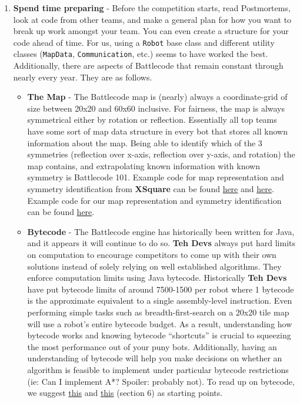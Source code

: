 \begin{enumerate}
  \item \textbf{Spend time preparing} - Before the competition starts, read Postmortems, look at code from other teams, and make a general plan for how you want to break up work amongst your team. You can even create a structure for your code ahead of time. For us, using a \verb|Robot| base class and different utility classes (\verb|MapData|, \verb|Communication|, etc.) seems to have worked the best. Additionally, there are aspects of Battlecode that remain constant through nearly every year. They are as follows.
  \begin{itemize}
      \item \textbf{The Map} - The Battlecode map is (nearly) always a coordinate-grid of size between 20x20 and 60x60 inclusive. For fairness, the map is always symmetrical either by rotation or reflection. Essentially all top teams have some sort of map data structure in every bot that stores all known information about the map. Being able to identify which of the 3 symmetries (reflection over x-axis, reflection over y-axis, and rotation) the map contains, and extrapolating known information with known symmetry is Battlecode 101. Example code for map representation and symmetry identification from \textbf{XSquare} can be found \href{https://github.com/IvanGeffner/BC25/blob/master/basic45/Map.java}{here} and \href{https://github.com/IvanGeffner/BC25/blob/master/basic45/SymmetryManager.java}{here}. Example code for our map representation and symmetry identification can be found \href{https://github.com/justinottesen/battlecode25/blob/main/java/src/quals/util/MapData.java}{here}. 
      \item \textbf{Bytecode} - The Battlecode engine has historically been written for Java, and it appears it will continue to do so. \textbf{Teh Devs} always put hard limits on computation to encourage competitors to come up with their own solutions instead of solely relying on well established algorithms. They enforce computation limits using Java bytecode. Historically \textbf{Teh Devs} have put bytecode limits of around 7500-1500 per robot where 1 bytecode is the approximate equivalent to a single assembly-level instruction. Even performing simple tasks such as breadth-first-search on a 20x20 tile map will use a robot's entire bytecode budget. As a result, understanding how bytecode works and knowing bytecode ``shortcuts'' is crucial to squeezing the most performance out of your puny bots. Additionally, having an understanding of bytecode will help you make decisions on whether an algorithm is feasible to implement under particular bytecode restrictions (ie: Can I implement A*? Spoiler: probably not). To read up on bytecode, we suggest \href{https://cory.li/bytecode-hacking/}{this} and \href{https://battlecode.org/assets/files/battlecode-guide-xsquare.pdf}{this} (section 6) as starting points.

\end{itemize}
\end{enumerate}
